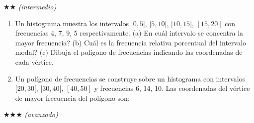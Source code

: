 \documentclass[11pt, letterpaper]{article}
\begin{document}
$\bigstar\bigstar$ \textit{(intermedio)}

\begin{enumerate}[label=\textbf{\arabic*.}, leftmargin=*, resume]
  \item Un histograma muestra los intervalos $[0,5[$, $[5,10[$, $[10,15[$, $[15,20]$ con frecuencias 4, 7, 9, 5 respectivamente. (a) \textquestiondown En cu\'al intervalo se concentra la mayor frecuencia? (b) \textquestiondown Cu\'al es la frecuencia relativa porcentual del intervalo modal? (c) Dibuja el pol\'igono de frecuencias indicando las coordenadas de cada v\'ertice.

  \item Un pol\'igono de frecuencias se construye sobre un histograma con intervalos $[20,30[$, $[30,40[$, $[40,50]$ y frecuencias 6, 14, 10. Las coordenadas del v\'ertice de mayor frecuencia del pol\'igono son:
  \begin{minipage}[t]{\linewidth}
  \begin{minipage}{\linewidth}\vspace{4mm}
  \end{minipage}\vspace{4mm}
  \end{minipage}
\end{enumerate}

$\bigstar\bigstar\bigstar$ \textit{(avanzado)}
\end{document}
